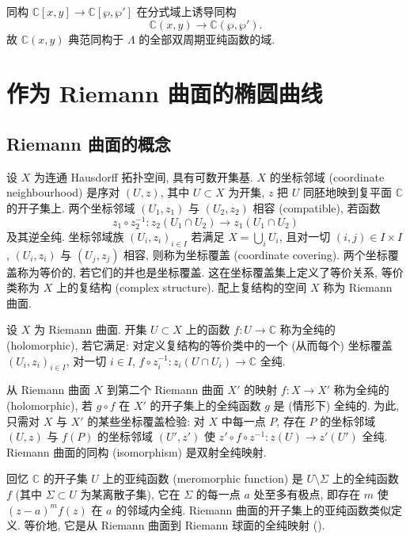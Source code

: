 同构 $\mathbb{C}[x, y]\to\mathbb{C}[\wp, \wp']$ 在分式域上诱导同构
\[
\mathbb{C}(x, y)\to\mathbb{C}(\wp, \wp').
\]
故 $\mathbb{C}(x, y)$ 典范同构于 $\Lambda$ 的全部双周期亚纯函数的域.

\section{作为 Riemann 曲面的椭圆曲线}\label{sec:3.3}

\subsection*{Riemann 曲面的概念}

设 $X$ 为连通 Hausdorff 拓扑空间, 具有可数开集基. $X$ 的坐标邻域 (coordinate neighbourhood) 是序对 $(U, z)$, 其中 $U\subset X$ 为开集, $z$ 把 $U$ 同胚地映到复平面 $\mathbb{C}$ 的开子集上. 两个坐标邻域 $(U_1, z_1)$ 与 $(U_2, z_2)$ 相容 (compatible), 若函数
\[
z_1\circ z_2^{-1}\colon z_2(U_1\cap U_2)\to z_1(U_1\cap U_2)
\]
及其逆全纯. 坐标邻域族 $(U_i, z_i)_{i\in I}$ 若满足 $X = \bigcup_i U_i$, 且对一切 $(i, j)\in I\times I$, $(U_i, z_i)$ 与 $(U_j, z_j)$ 相容, 则称为坐标覆盖 (coordinate covering). 两个坐标覆盖称为等价的, 若它们的并也是坐标覆盖. 这在坐标覆盖集上定义了等价关系, 等价类称为 $X$ 上的复结构 (complex structure). 配上复结构的空间 $X$ 称为 Riemann 曲面.

设 $X$ 为 Riemann 曲面. 开集 $U\subset X$ 上的函数 $f\colon U\to\mathbb{C}$ 称为全纯的 (holomorphic), 若它满足: 对定义复结构的等价类中的一个 (从而每个) 坐标覆盖 $(U_i, z_i)_{i\in I}$, 对一切 $i\in I$, $f\circ z_i^{-1}\colon z_i(U\cap U_i)\to\mathbb{C}$ 全纯.

从 Riemann 曲面 $X$ 到第二个 Riemann 曲面 $X'$ 的映射 $f\colon X\to X'$ 称为全纯的 (holomorphic), 若 $g\circ f$ 在 $X'$ 的开子集上的全纯函数 $g$ 是 (情形下) 全纯的. 为此, 只需对 $X$ 与 $X'$ 的某些坐标覆盖检验: 对 $X$ 中每一点 $P$, 存在 $P$ 的坐标邻域 $(U, z)$ 与 $f(P)$ 的坐标邻域 $(U', z')$ 使 $z'\circ f\circ z^{-1}\colon z(U)\to z'(U')$ 全纯. Riemann 曲面的同构 (isomorphism) 是双射全纯映射.

回忆 $\mathbb{C}$ 的开子集 $U$ 上的亚纯函数 (meromorphic function) 是 $U\setminus\Sigma$ 上的全纯函数 $f$ (其中 $\Sigma\subset U$ 为某离散子集), 它在 $\Sigma$ 的每一点 $a$ 处至多有极点, 即存在 $m$ 使 $(z-a)^mf(z)$ 在 $a$ 的邻域内全纯. Riemann 曲面的开子集上的亚纯函数类似定义. 等价地, 它是从 Riemann 曲面到 Riemann 球面的全纯映射 (\cite[VI, 4.5]{cartan1963}).

